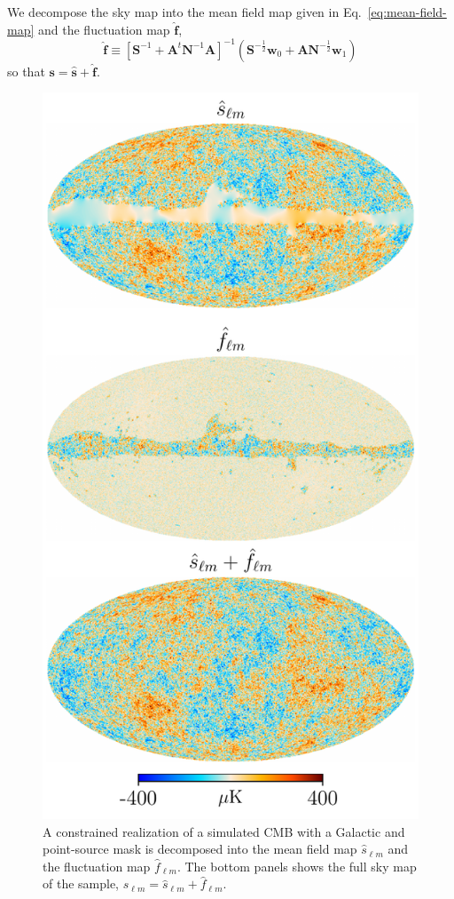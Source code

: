 \documentclass[twocolumn]{../common/aa}
\begin{document}
We decompose the sky map into the mean field map given in Eq.~\eqref{eq:mean-field-map} and the fluctuation map $\boldsymbol{\hat{f}}$,
\begin{equation}
\label{eq:fluc-map}
\boldsymbol{\hat{f}} \equiv \left[\boldsymbol{S}^{-1} + \boldsymbol{A}^t \boldsymbol{N}^{-1}\boldsymbol{A} \right]^{-1} \left(\boldsymbol{S}^{-\frac{1}{2}}\boldsymbol{w}_0 +\boldsymbol{A N}^{-\frac{1}{2}}\boldsymbol{w}_1 \right)
\end{equation}
so that $\boldsymbol{s} = \boldsymbol{\hat{s}} + \boldsymbol{\hat{f}}$.
\begin{figure}
	\centering
	\includegraphics[width=\linewidth]{figures/s_hat_f_hat.pdf}
	\caption{\label{fig:sky_map}A constrained realization of a simulated CMB with a Galactic and point-source mask is decomposed into the mean field map $\hat{s}_{\ell m}$ and the fluctuation map $\hat{f}_{\ell m}$. The bottom panels shows the full sky map of the sample, $s_{\ell m} = \hat{s}_{\ell m} + \hat{f}_{\ell m}$.}
\end{figure}
\end{document}
